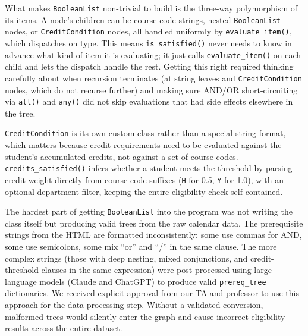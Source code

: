 \documentclass[11pt]{article}
\begin{document}
What makes \verb|BooleanList| non-trivial to build is the three-way polymorphism of its
items. A node's children can be course code strings, nested \verb|BooleanList| nodes, or
\verb|CreditCondition| nodes, all handled uniformly by \verb|evaluate_item()|, which
dispatches on type. This means \verb|is_satisfied()| never needs to know in advance what
kind of item it is evaluating; it just calls \verb|evaluate_item()| on each child and lets
the dispatch handle the rest. Getting this right required thinking carefully about when
recursion terminates (at string leaves and \verb|CreditCondition| nodes, which do not recurse
further) and making sure AND/OR short-circuiting via \verb|all()| and \verb|any()| did not
skip evaluations that had side effects elsewhere in the tree.

\verb|CreditCondition| is its own custom class rather than a special string format, which
matters because credit requirements need to be evaluated against the student's accumulated
credits, not against a set of course codes. \verb|credits_satisfied()| infers whether a
student meets the threshold by parsing credit weight directly from course code suffixes
(\verb|H| for 0.5, \verb|Y| for 1.0), with an optional department filter, keeping the
entire eligibility check self-contained.

The hardest part of getting \verb|BooleanList| into the program was not writing the class
itself but producing valid trees from the raw calendar data. The prerequisite strings from
the HTML are formatted inconsistently: some use commas for AND, some use semicolons, some mix
``or'' and ``/'' in the same clause. The more complex strings (those with deep nesting,
mixed conjunctions, and credit-threshold clauses in the same expression) were
post-processed using large language models (Claude and ChatGPT) to produce valid
\verb|prereq_tree| dictionaries. We received explicit approval from our TA and professor to
use this approach for the data processing step. Without a validated conversion, malformed
trees would silently enter the graph and cause incorrect eligibility results across the entire
dataset.
\end{document}
